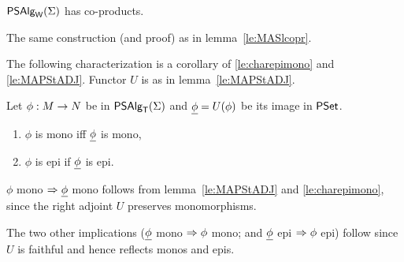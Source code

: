 \documentclass[10pt]{article}
\begin{document}
\begin{Fact}
$\mbox{\sf PSAlg}_{\sf W}(\Sigma)$ has co-products.
\end{Fact}

\begin{Proof}
The same construction (and proof) as in lemma~\ref{le:MASlcopr}.
\end{Proof}

\noindent
The following characterization is a corollary of \ref{le:charepimono}
and \ref{le:MAPStADJ}. Functor $U$ is as in lemma~\ref{le:MAPStADJ}.

\begin{Fact}
Let $\phi:M\rightarrow N$ be in $\mbox{\sf PSAlg}_{\sf T}(\Sigma)$ and $\underline {\phi}=U(\phi)$ be its
image in $\mbox{\rm\sf PSet}$.
\begin{enumerate}\MyLPar
\item $\phi$ is mono iff $\underline {\phi}$ is mono,
\item $\phi$ is epi if $\underline {\phi}$ is epi.
\end{enumerate}

\end{Fact}

\begin{Proof}
$\phi$ mono $\Rightarrow\underline {\phi}$ mono follows from
lemma~\ref{le:MAPStADJ} and \ref{le:charepimono}, since the right
adjoint $U$ preserves monomorphisms.


The two other implications ($\underline {\phi}$ mono $\Rightarrow \phi$ mono; and
$\underline {\phi}$ epi $\Rightarrow \phi$ epi) follow since
$U$ is faithful and hence reflects monos and epis.

%
\end{Proof}
\end{document}
